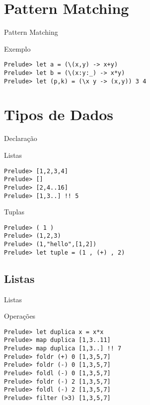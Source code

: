 \documentclass{beamer}
\begin{document}
	\section{Pattern Matching}
	
		\begin{frame}[fragile]{Pattern Matching}	 
		 \begin{block}{Exemplo}
		  \begin{lstlisting}
Prelude> let a = (\(x,y) -> x+y)
Prelude> let b = (\(x:y:_) -> x*y)
Prelude> let (p,k) = (\x y -> (x,y)) 3 4
		  \end{lstlisting}
		 \end{block}
		\end{frame}
	
	\section{Tipos de Dados}
	
		\begin{frame}[fragile]{Declaração}
			\begin{block}{Listas}
		\begin{lstlisting}
Prelude> [1,2,3,4]
Prelude> []
Prelude> [2,4..16]
Prelude> [1,3..] !! 5
		 \end{lstlisting}
		\end{block}
		
		\begin{block}{Tuplas}
		\begin{lstlisting}
Prelude> ( 1 )
Prelude> (1,2,3)
Prelude> (1,"hello",[1,2])
Prelude> let tuple = (1 , (+) , 2)
		 \end{lstlisting}
		\end{block}
		
		\end{frame}
	
	\subsection{Listas}
	
	\begin{frame}[fragile]{Listas}	 
		\begin{block}{Operações}	  
			\begin{lstlisting}
Prelude> let duplica x = x*x
Prelude> map duplica [1,3..11]
Prelude> map duplica [1,3..] !! 7
Prelude> foldr (+) 0 [1,3,5,7]
Prelude> foldr (-) 0 [1,3,5,7]
Prelude> foldl (-) 0 [1,3,5,7]
Prelude> foldr (-) 2 [1,3,5,7]
Prelude> foldl (-) 2 [1,3,5,7]
Prelude> filter (>3) [1,3,5,7]
			\end{lstlisting}
		\end{block}	 
	\end{frame}
	
\end{document}
